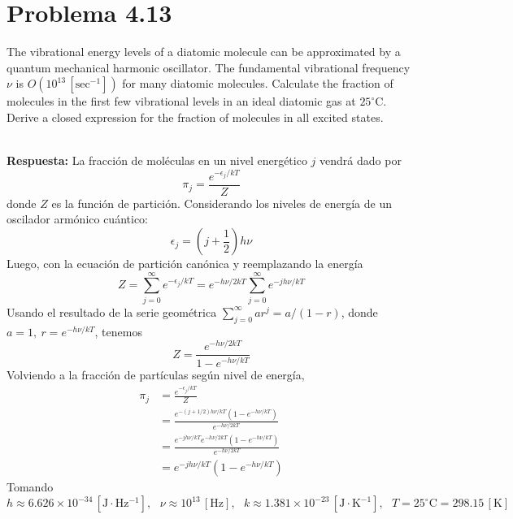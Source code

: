 \documentclass[]{article}
\numberwithin{equation}{section}
\newcommand{\0}{\textcolor{gray}{0}}
\newcommand{\resp}{
	\\
	
	\textbf{Respuesta:} }
\newcommand{\celsius}{^\circ\mathrm{C}}
\begin{document}
\section{Problema 4.13}
The vibrational energy levels of a diatomic molecule can be approximated by a quantum mechanical harmonic oscillator. The fundamental vibrational frequency $\nu$ is $O(10^{13} \, \mathrm{[sec^{-1}]})$ for many diatomic molecules. Calculate the fraction of molecules in the first few vibrational levels in an ideal diatomic gas at $25^\circ\mathrm{C}$. Derive a closed expression for the fraction of molecules in all excited states.
\resp La fracción de moléculas en un nivel energético $j$ vendrá dado por
\begin{equation}
	\pi_j = \frac{e^{-\epsilon_j/kT}}{Z}
\end{equation}
donde $Z$ es la función de partición. Considerando los niveles de energía de un oscilador armónico cuántico:
\begin{equation}
	\epsilon_j = \left(j + \frac{1}{2}\right) h \nu
\end{equation}
Luego, con la ecuación de partición canónica y reemplazando la energía
\begin{equation*}
	Z = \sum_{j=0}^{\infty} e^{-\epsilon_j/kT} = e^{-h\nu/2kT} \sum_{j=0}^{\infty} e^{-j h \nu/kT}
\end{equation*}
Usando el resultado de la serie geométrica $\sum_{j=0}^{\infty} a r^j = a/(1-r)$, donde $a = 1, ~ r = e^{-h\nu/kT}$, tenemos
\begin{equation*}
	Z = \frac{e^{-h\nu/2kT}}{1 - e^{-h\nu/kT}}
\end{equation*}
Volviendo a la fracción de partículas según nivel de energía,
\begin{align}
	\pi_j &= \frac{e^{-\epsilon_j/kT}}{Z} \nonumber\\
	&= \frac{e^{-\left(j + 1/2\right) h \nu/kT} \left(1 - e^{-h\nu/kT}\right)}{e^{-h\nu/2kT}}\nonumber\\
	&= \frac{e^{-j h \nu/kT} e^{-h \nu/2kT} \left(1 - e^{-h\nu/kT}\right)}{e^{-h\nu/2kT}}\nonumber\\
	&= e^{-j h \nu/kT} \left(1 - e^{-h\nu/kT}\right)
\end{align}
Tomando
\begin{equation*}
	h \approx 6.626 \times 10^{-34} \, \mathrm{[J \cdot Hz^{-1}]}, ~~~ \nu \approx 10^{13} \, \mathrm{[Hz]}, ~~~ k \approx 1.381 \times 10^{-23} \, \mathrm{[J \cdot K^{-1}]}, ~~~ T = 25\celsius = 298.15 \, \mathrm{[K]}
\end{equation*}
\end{document}
